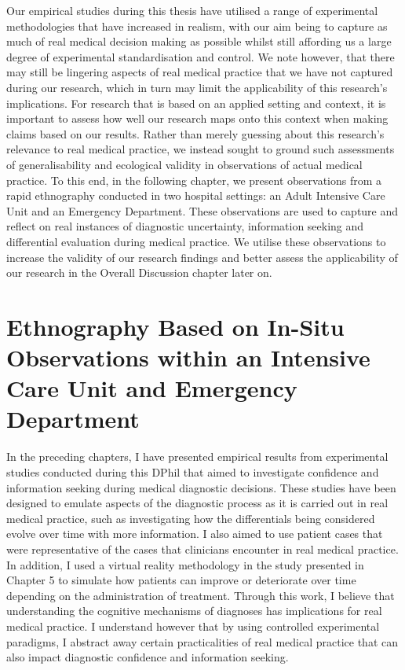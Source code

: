 \documentclass[a4paper, nobind]{templates/ociamthesis}
\begin{document}
Our empirical studies during this thesis have utilised a range of experimental methodologies that have increased in realism, with our aim being to capture as much of real medical decision making as possible whilst still affording us a large degree of experimental standardisation and control. We note however, that there may still be lingering aspects of real medical practice that we have not captured during our research, which in turn may limit the applicability of this research's implications. For research that is based on an applied setting and context, it is important to assess how well our research maps onto this context when making claims based on our results. Rather than merely guessing about this research's relevance to real medical practice, we instead sought to ground such assessments of generalisability and ecological validity in observations of actual medical practice. To this end, in the following chapter, we present observations from a rapid ethnography conducted in two hospital settings: an Adult Intensive Care Unit and an Emergency Department. These observations are used to capture and reflect on real instances of diagnostic uncertainty, information seeking and differential evaluation during medical practice. We utilise these observations to increase the validity of our research findings and better assess the applicability of our research in the Overall Discussion chapter later on.

\chapter{Ethnography Based on In-Situ Observations within an Intensive Care Unit and Emergency Department}\label{chapter-6}

\adjustmtc
{}

In the preceding chapters, I have presented empirical results from experimental studies conducted during this DPhil that aimed to investigate confidence and information seeking during medical diagnostic decisions. These studies have been designed to emulate aspects of the diagnostic process as it is carried out in real medical practice, such as investigating how the differentials being considered evolve over time with more information. I also aimed to use patient cases that were representative of the cases that clinicians encounter in real medical practice. In addition, I used a virtual reality methodology in the study presented in Chapter 5 to simulate how patients can improve or deteriorate over time depending on the administration of treatment. Through this work, I believe that understanding the cognitive mechanisms of diagnoses has implications for real medical practice. I understand however that by using controlled experimental paradigms, I abstract away certain practicalities of real medical practice that can also impact diagnostic confidence and information seeking.
\end{document}
